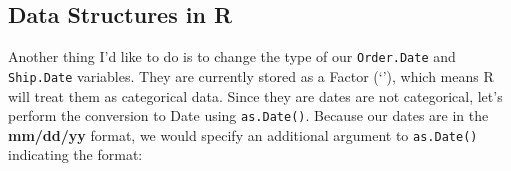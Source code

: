 \documentclass[]{article}
\newenvironment{Shaded}{\begin{snugshade}}{\end{snugshade}}
\newcommand{\CommentTok}[1]{\textcolor[rgb]{0.56,0.35,0.01}{\textit{#1}}}
\newcommand{\DecValTok}[1]{\textcolor[rgb]{0.00,0.00,0.81}{#1}}
\newcommand{\KeywordTok}[1]{\textcolor[rgb]{0.13,0.29,0.53}{\textbf{#1}}}
\newcommand{\NormalTok}[1]{#1}
\newcommand{\OperatorTok}[1]{\textcolor[rgb]{0.81,0.36,0.00}{\textbf{#1}}}
\newcommand{\StringTok}[1]{\textcolor[rgb]{0.31,0.60,0.02}{#1}}
\begin{document}
\hypertarget{data-structures-in-r}{%
\subsection{Data Structures in R}\label{data-structures-in-r}}

Another thing I'd like to do is to change the type of our
\texttt{Order.Date} and \texttt{Ship.Date} variables. They are currently
stored as a Factor (`'), which means R will treat them as categorical
data. Since they are dates are not categorical, let's perform the
conversion to Date using \texttt{as.Date()}. Because our dates are in
the \textbf{mm/dd/yy} format, we would specify an additional argument to
\texttt{as.Date()} indicating the format:

\begin{Shaded}
\end{Shaded}
\end{document}
